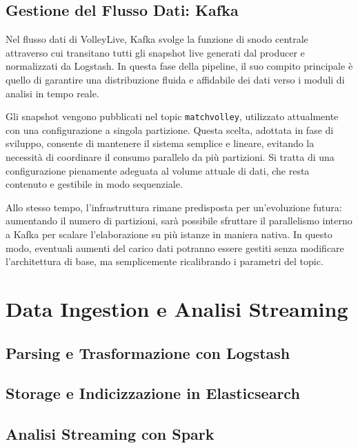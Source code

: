\documentclass[a4paper,12pt]{report}
\begin{document}
\section{Gestione del Flusso Dati: Kafka}

Nel flusso dati di VolleyLive, Kafka svolge la funzione di snodo centrale attraverso cui transitano tutti gli snapshot live generati dal producer e normalizzati da Logstash. In questa fase della pipeline, il suo compito principale è quello di garantire una distribuzione fluida e affidabile dei dati verso i moduli di analisi in tempo reale.

Gli snapshot vengono pubblicati nel topic \texttt{matchvolley}, utilizzato attualmente con una configurazione a singola partizione. Questa scelta, adottata in fase di sviluppo, consente di mantenere il sistema semplice e lineare, evitando la necessità di coordinare il consumo parallelo da più partizioni. Si tratta di una configurazione pienamente adeguata al volume attuale di dati, che resta contenuto e gestibile in modo sequenziale.

Allo stesso tempo, l’infrastruttura rimane predisposta per un’evoluzione futura: aumentando il numero di partizioni, sarà possibile sfruttare il parallelismo interno a Kafka per scalare l’elaborazione su più istanze in maniera nativa. In questo modo, eventuali aumenti del carico dati potranno essere gestiti senza modificare l’architettura di base, ma semplicemente ricalibrando i parametri del topic.





\chapter{Data Ingestion e Analisi Streaming}

\section{Parsing e Trasformazione con Logstash}

\section{Storage e Indicizzazione in Elasticsearch}

\section{Analisi Streaming con Spark}
\end{document}

